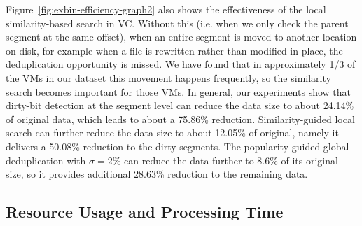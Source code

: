 Figure~\ref{fig:exbin-efficiency-graph2} also shows the effectiveness of the local similarity-based search in VC.
Without this (i.e. when we only check the parent segment at the same offset), when an entire
segment is moved to another location on disk, for example when a file is rewritten
rather than modified in place, the deduplication opportunity is missed. We have found that in
approximately 1/3 of the VMs in our dataset this movement happens frequently,
so the similarity search becomes important for those VMs.
In general, our experiments show that
dirty-bit detection at the segment level can reduce the data size to about 24.14\% of original data, 
which leads to about a 75.86\% reduction.
Similarity-guided local search can further reduce the data size
to about 12.05\% of original, namely it delivers a 50.08\% reduction to the dirty segments.
The popularity-guided global deduplication with $\sigma=2\% $
can reduce the data further to 8.6\% of its original size, so
it provides additional 28.63\% reduction to the remaining data.


\subsection{Resource Usage and Processing Time}


